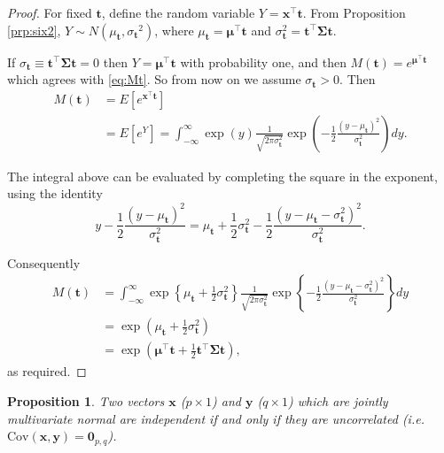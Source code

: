 \documentclass[]{book}
\newtheorem{proposition}{Proposition}[chapter]
\theoremstyle{definition}
\theoremstyle{definition}
\theoremstyle{definition}
\theoremstyle{remark}
\begin{document}
\begin{proof}
{}For fixed \({\boldsymbol t}\), define the random variable \(Y=\boldsymbol x^\top {\boldsymbol t}\). From Proposition \ref{prp:six2},
\(Y \sim N(\mu_{{\boldsymbol t}}, {\sigma_{\boldsymbol t}}^2)\),
where \(\mu_{\boldsymbol t}=\boldsymbol \mu^\top {\boldsymbol t}\) and \(\sigma^2_{\boldsymbol t}={\boldsymbol t}^\top \boldsymbol \Sigma{\boldsymbol t}\).

If \(\sigma_{\boldsymbol t}\equiv {\boldsymbol t}^\top \boldsymbol \Sigma{\boldsymbol t}=0\) then \(Y=\boldsymbol \mu^\top {\boldsymbol t}\) with probability one, and then \(M({\boldsymbol t})=e^{\boldsymbol \mu^\top {\boldsymbol t}}\) which agrees with \eqref{eq:Mt}. So from now on we assume \(\sigma_{{\boldsymbol t}}>0\). Then
\begin{align*}
M({\boldsymbol t})&=E[e^{\boldsymbol x^\top {\boldsymbol t}}]\\
&=E[e^{Y}]=\int_{-\infty}^\infty \exp(y) \frac{1}{\sqrt{2\pi \sigma_{\boldsymbol t}^2}}
\exp\left (-\frac{1}{2}\frac{(y-\mu_{\boldsymbol t})^2}{\sigma_{\boldsymbol t}^2} \right )dy.
\end{align*}

The integral above can be evaluated by completing the square in the exponent, using the identity
\[
y-\frac{1}{2}\frac{(y-\mu_{\boldsymbol t})^2}{\sigma_{\boldsymbol t}^2}=\mu_{\boldsymbol t}
+\frac{1}{2}\sigma_{\boldsymbol t}^2-\frac{1}{2}\frac{(y-\mu_{\boldsymbol t}-\sigma_{\boldsymbol t}^2)^2}{\sigma_{\boldsymbol t}^2}.
\]

Consequently
\begin{align*}
M({\boldsymbol t})&=\int_{-\infty}^\infty \exp \left\{\mu_{\boldsymbol t}+\frac{1}{2}\sigma_{\boldsymbol t}^2 \right\}
\frac{1}{\sqrt{2 \pi \sigma_{\boldsymbol t}^2}}\exp \left\{ -\frac{1}{2} \frac{(y-\mu_{\boldsymbol t}-\sigma_{\boldsymbol t}^2)^2}
{\sigma_{\boldsymbol t}^2}\right\}dy\\
&=\exp\left( \mu_{\boldsymbol t}+ \frac{1}{2}\sigma_{\boldsymbol t}^2  \right)\\
&=\exp\left(
\boldsymbol \mu^\top {\boldsymbol t}+ \frac{1}{2}{\boldsymbol t}^\top \boldsymbol \Sigma{\boldsymbol t}\right),
\end{align*}
as required.
\end{proof}

\begin{proposition}
\protect\hypertarget{prp:six4}{}{\label{prp:six4} }Two vectors \(\boldsymbol x\) (\(p \times 1\)) and \(\boldsymbol y\) (\(q \times 1\)) which are jointly multivariate normal are independent if and only if they are uncorrelated (i.e. \(\text{Cov}(\boldsymbol x,\boldsymbol y) = \boldsymbol 0_{p,q}\)).
\end{proposition}
\end{document}
